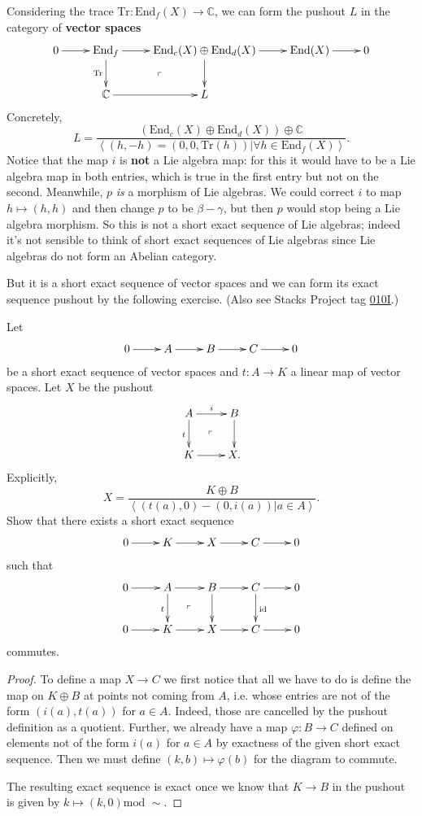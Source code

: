 \noindent
Considering the trace $\text{Tr}:\text{End}_f(X) \to \mathbb{C}$,
we can form the pushout $L$ in the
category of
{\bf vector spaces}
$$
\xymatrix{
0\ar[r]&\text{End}_f\ar[r]\ar[d]_{\text{Tr}}\ar@{}[dr]|-{\ulcorner}&
\text{End}_c(X) \oplus \text{End}_d(X)\ar[d]\ar[r]&
\text{End}(X)\ar[r]&0\\
&\mathbb{C}\ar[r]& L
}
$$
Concretely,
$$
L=\frac{(\text{End}_c(X) \oplus \text{End}_d(X))\oplus \mathbb{C}}
{\left<(h,-h)=(0,0,\text{Tr}(h))|
\forall  h \in \text{End}_f(X)\right>}.
$$
Notice that the map $i$
is {\bf not} a Lie algebra map:
for this it would have to be a Lie algebra map
in both entries, which is true in the first entry
but not on the second.
Meanwhile, $p$ {\it is} a morphism of Lie algebras.
We could correct $i$ to map $h\mapsto  (h,h)$ 
and then change $p$ to be $\beta-\gamma$,
but then $p$ would stop being a Lie algebra morphism.
So this is not a short exact sequence of Lie algebras;
indeed it's not sensible to think of
short exact sequences of Lie algebras
since Lie algebras do not form an Abelian category.

But it is a short exact sequence of vector spaces
and we can form its exact sequence pushout by the following
exercise. (Also see Stacks Project tag
\href{https://stacks.math.columbia.edu/tag/010I}{010I}.)

\begin{exercise}
\label{exercise-pushout}
Let
$$
\xymatrix{
0\ar[r]&A\ar[r]&B\ar[r]&C\ar[r]&0
}
$$
be a short exact sequence of vector spaces
and $t:A \to K$ a linear map of vector spaces.
Let $X$ be the pushout
$$
\xymatrix{
A\ar[r]^i\ar[d]_t\ar@{}[dr]|-{\ulcorner}&B\ar[d]\\
K\ar[r]&X.
}
$$
Explicitly,
$$
X=\frac{K \oplus B}{\left<(t(a),0)-(0,i(a))|a \in A\right>}.
$$
Show that there exists a short exact sequence
 $$
\xymatrix{
0\ar[r]&K\ar[r]&X\ar[r]&C\ar[r]&0
}
$$
such that
$$
\xymatrix{
0\ar[r]&A\ar[r]\ar[d]_{t}\ar@{}[dr]|-{\ulcorner}&
B\ar[d]\ar[r]&
C\ar[r]\ar[d]^{\text{id}}&0\\
0\ar[r]&K\ar[r]& X\ar[r]& C\ar[r]&0
}
$$
commutes.
\end{exercise}

\begin{proof}
To define a map $X \to C$ we first notice
that all we have to do is define the map on
$K \oplus B$ at points not coming from $A$,
i.e. whose entries are not of the form
$(i(a),t(a))$ for $a \in A$.
Indeed, those are cancelled by the pushout definition
as a quotient. Further, we already have a map $\varphi:B \to C$
defined on elements not of the form $i(a)$ for $a \in A$ 
by exactness of the given short exact sequence.
Then we must define $(k,b) \mapsto \varphi(b)$
for the diagram to commute.

The resulting exact sequence is exact once
we know that $K \to B$ in the pushout
is given by $k \mapsto (k,0) \text{mod }\sim$.
\end{proof}

